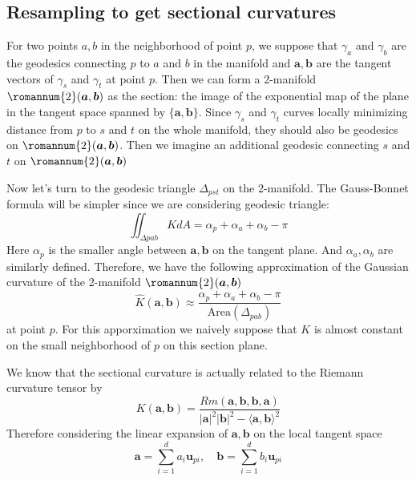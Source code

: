 \documentclass{article}
\begin{document}
\subsection{Resampling to get sectional curvatures}
 For two points $a,b$ in the neighborhood of point $p$, we suppose that 
 $\gamma_a$ and $\gamma_b$ are the geodesics connecting $p$ to $a$ and $b$ in the manifold and $\boldsymbol{a},\boldsymbol{b}$ are the tangent vectors of $\gamma_s$ and $\gamma_t$ at point $p$. Then we can form a 2-manifold $\romannum{2}(\boldsymbol{a},\boldsymbol{b})$ as the section: the image of the exponential map of the plane in the tangent space spanned by $\{\boldsymbol{a},\boldsymbol{b}\}$. Since $\gamma_s$ and $\gamma_t$ curves locally minimizing distance from $p$ to $s$ and $t$ on the whole manifold, they should also be geodesics on $\romannum{2}(\boldsymbol{a},\boldsymbol{b})$. Then we imagine an additional geodesic connecting $s$ and $t$ on $\romannum{2}(\boldsymbol{a},\boldsymbol{b})$
\par
Now let's turn to the geodesic triangle $\Delta_{pst}$ on the 2-manifold. The Gauss-Bonnet formula will be simpler since we are considering geodesic triangle:
\begin{equation}
	 	\iint_{\Delta{pab}}KdA =\alpha_p+\alpha_a+\alpha_b - \pi
\end{equation}
Here $\alpha_p$ is the smaller angle between $\boldsymbol{a},\boldsymbol{b}$ on the tangent plane. And $\alpha_a,\alpha_b$ are similarly defined.
Therefore, we have the following approximation of the Gaussian curvature of the 2-manifold $\romannum{2}(\boldsymbol{a},\boldsymbol{b})$
\begin{equation}
	\widehat{K}(\boldsymbol{a},\boldsymbol{b})\approx\frac{\alpha_p+\alpha_a+\alpha_b-\pi}{\text{Area}(\Delta_{pab})}
	\label{approxK}
\end{equation}
at point $p$. For this apporximation we naively suppose that $K$ is almost constant on the small neighborhood of $p$ on this section plane.
\par
We know that the sectional curvature is actually related to the Riemann curvature tensor by 
\begin{equation}
	K(\boldsymbol{a},\boldsymbol{b})=\frac{Rm(\boldsymbol{a},\boldsymbol{b},\boldsymbol{b},\boldsymbol{a})}{|\boldsymbol{a}|^2|\boldsymbol{b}|^2-\langle \boldsymbol{a},\boldsymbol{b}\rangle^2}
	\label{secCurve}
\end{equation}
Therefore considering the linear expansion of $\boldsymbol{a},\boldsymbol{b}$ on the local tangent space
\begin{equation}
	\boldsymbol{a}=\sum_{i=1}^da_i\boldsymbol{u}_{pi},\quad \boldsymbol{b}=\sum_{i=1}^db_i\boldsymbol{u}_{pi}
	\label{expandst}
\end{equation}
\end{document}
